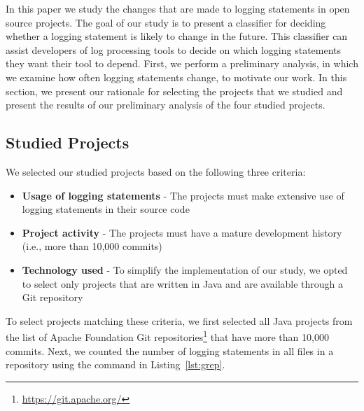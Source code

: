 In this paper we study the changes that are made to logging statements  in open source projects. The goal of our study is to present a classifier for deciding whether a logging statement is likely to change in the future. This classifier can assist developers of log processing tools to decide on which logging statements they want their tool to depend. %
First, we perform a preliminary analysis, in which we examine how often logging statements change, to motivate our work. In this section, we present our rationale for selecting the projects that we studied and present the results of our preliminary analysis of the four studied projects. 

\subsection{Studied Projects}
We selected our studied projects based on the following three criteria:
\begin{itemize}
	\item \textbf{Usage of logging statements} - The projects must make extensive use of logging statements in their source code
	\item \textbf{Project activity} - The projects must have a mature development history (i.e., more than 10,000 commits)
	\item \textbf{Technology used} - To simplify the implementation of our study, we opted to select only projects that are written in Java and are available through a Git repository
\end{itemize}

To select projects matching these criteria, we first selected all Java projects from the list of Apache Foundation Git repositories\footnote{\url{https://git.apache.org/}} that have more than 10,000 commits. Next, we counted the number of logging statements in all  files in a repository using the  command in Listing~\ref{lst:grep}.

